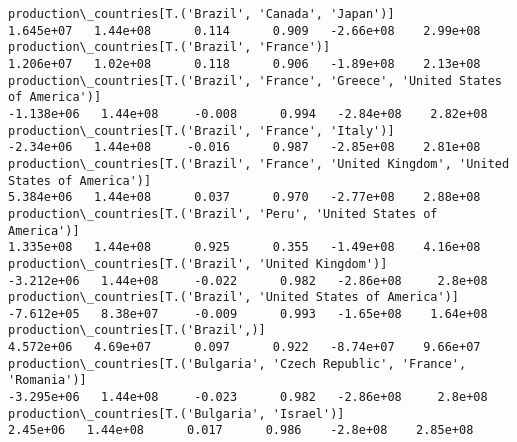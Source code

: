 \documentclass[11pt]{article}
\begin{document}
\begin{Verbatim}[commandchars=\\\{\}]
production\_countries[T.('Brazil', 'Canada', 'Japan')]                                                                                                                                  1.645e+07   1.44e+08      0.114      0.909   -2.66e+08    2.99e+08
production\_countries[T.('Brazil', 'France')]                                                                                                                                           1.206e+07   1.02e+08      0.118      0.906   -1.89e+08    2.13e+08
production\_countries[T.('Brazil', 'France', 'Greece', 'United States of America')]                                                                                                    -1.138e+06   1.44e+08     -0.008      0.994   -2.84e+08    2.82e+08
production\_countries[T.('Brazil', 'France', 'Italy')]                                                                                                                                  -2.34e+06   1.44e+08     -0.016      0.987   -2.85e+08    2.81e+08
production\_countries[T.('Brazil', 'France', 'United Kingdom', 'United States of America')]                                                                                             5.384e+06   1.44e+08      0.037      0.970   -2.77e+08    2.88e+08
production\_countries[T.('Brazil', 'Peru', 'United States of America')]                                                                                                                 1.335e+08   1.44e+08      0.925      0.355   -1.49e+08    4.16e+08
production\_countries[T.('Brazil', 'United Kingdom')]                                                                                                                                  -3.212e+06   1.44e+08     -0.022      0.982   -2.86e+08     2.8e+08
production\_countries[T.('Brazil', 'United States of America')]                                                                                                                        -7.612e+05   8.38e+07     -0.009      0.993   -1.65e+08    1.64e+08
production\_countries[T.('Brazil',)]                                                                                                                                                    4.572e+06   4.69e+07      0.097      0.922   -8.74e+07    9.66e+07
production\_countries[T.('Bulgaria', 'Czech Republic', 'France', 'Romania')]                                                                                                           -3.295e+06   1.44e+08     -0.023      0.982   -2.86e+08     2.8e+08
production\_countries[T.('Bulgaria', 'Israel')]                                                                                                                                          2.45e+06   1.44e+08      0.017      0.986    -2.8e+08    2.85e+08

\end{Verbatim}
\end{document}
